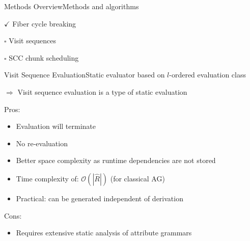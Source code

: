 
\begin{frame}{Methods Overview}{Methods and algorithms}
     \begin{description}
        \item $\checkmark$ Fiber cycle breaking
        \item $\square$  \alert{Visit sequences}
        \item $\square$  SCC chunk scheduling
    \end{description}
\end{frame}


\begin{frame}{Visit Sequence Evaluation}{Static evaluator based on $l$-ordered evaluation class}

$\Rightarrow$ \alert{Visit sequence evaluation} is a type of \alert{static evaluation}

\newlinevspace

Pros:
\begin{itemize}
    \item Evaluation \alert{will terminate}
    \item \alert{No re-evaluation}
    \item Better space complexity as runtime dependencies are not stored
    \item Time complexity of: $\mathcal{O}(| \hat{R} |)$ (for classical AG)
    \item \alert{Practical}: can be generated independent of derivation
\end{itemize}

Cons:
\begin{itemize}
    \item Requires extensive static analysis of attribute grammars
\end{itemize}
\end{frame}



